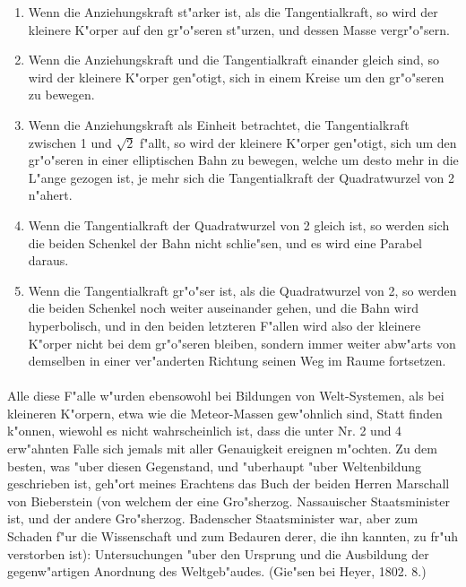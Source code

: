 \documentclass[a4paper, 11pt, oneside, polutonikogreek, german]{article}
\begin{document}
\begin{enumerate}
    \item Wenn die Anziehungskraft st"arker ist, als die Tangentialkraft, so wird der kleinere K"orper auf den gr"o"seren st"urzen, und dessen Masse vergr"o"sern.
    \item Wenn die Anziehungskraft und die Tangentialkraft einander gleich sind, so wird der kleinere K"orper gen"otigt, sich in einem Kreise um den gr"o"seren zu bewegen.
    \item Wenn die Anziehungskraft als Einheit betrachtet, die Tangentialkraft zwischen 1 und $\mathfrak{\sqrt{2}}$ f"allt, so wird der kleinere K"orper gen"otigt, sich um den gr"o"seren in einer elliptischen Bahn zu bewegen, welche um desto mehr in die L"ange gezogen ist, je mehr sich die Tangentialkraft der Quadratwurzel von 2 n"ahert.
    \item Wenn die Tangentialkraft der Quadratwurzel von 2 gleich ist, so werden sich die beiden Schenkel der Bahn nicht schlie"sen, und es wird eine Parabel daraus.
    \item Wenn die Tangentialkraft gr"o"ser ist, als die Quadratwurzel von 2, so werden die beiden Schenkel noch weiter auseinander gehen, und die Bahn wird hyperbolisch, und in den beiden letzteren F"allen wird also der kleinere K"orper nicht bei dem gr"o"seren bleiben, sondern immer weiter abw"arts von demselben in einer ver"anderten Richtung seinen Weg im Raume fortsetzen.
\end{enumerate}
\paragraph{}
Alle diese F"alle w"urden ebensowohl bei Bildungen von Welt-Systemen, als bei kleineren K"orpern, etwa wie die Meteor-Massen gew"ohnlich sind, Statt finden k"onnen, wiewohl es nicht wahrscheinlich ist, dass die unter Nr. 2 und 4 erw"ahnten Falle sich jemals mit aller Genauigkeit ereignen m"ochten. Zu dem besten, was "uber diesen Gegenstand, und "uberhaupt "uber Weltenbildung geschrieben ist, geh"ort meines Erachtens das Buch der beiden Herren Marschall von Bieberstein (von welchem der eine Gro"sherzog. Nassauischer Staatsminister ist, und der andere Gro"sherzog. Badenscher Staatsminister war, aber zum Schaden f"ur die Wissenschaft und zum Bedauren derer, die ihn kannten, zu fr"uh verstorben ist): Untersuchungen "uber den Ursprung und die Ausbildung der gegenw"artigen Anordnung des Weltgeb"audes. (Gie"sen bei Heyer, 1802. 8.)
\end{document}
